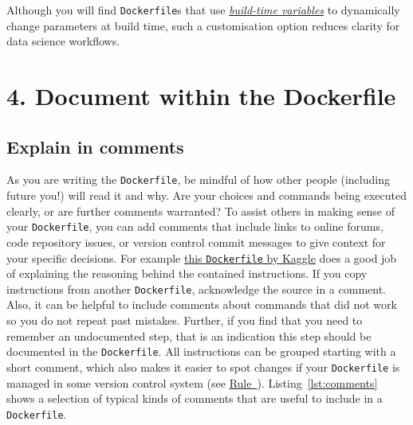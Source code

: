 \documentclass[10pt,letterpaper]{article}
\begin{document}
Although you will find \texttt{Dockerfile}s that use
\href{https://docs.docker.com/engine/reference/commandline/build/\#set-build-time-variables---build-arg}{\emph{build-time
variables}} to dynamically change parameters at build time, such a
customisation option reduces clarity for data science workflows.

\hypertarget{document-within-the-dockerfile}{%
\section{4. Document within the
Dockerfile}\label{document-within-the-dockerfile}}

  \label{rule:document} 

\hypertarget{explain-in-comments}{%
\subsection{Explain in comments}\label{explain-in-comments}}

As you are writing the \texttt{Dockerfile}, be mindful of how other
people (including future you!) will read it and why. Are your choices
and commands being executed clearly, or are further comments warranted?
To assist others in making sense of your \texttt{Dockerfile}, you can
add comments that include links to online forums, code repository
issues, or version control commit messages to give context for your
specific decisions. For example
\href{https://github.com/Kaggle/docker-rstats/blob/master/Dockerfile}{this
\texttt{Dockerfile} by Kaggle} does a good job of explaining the
reasoning behind the contained instructions. If you copy instructions
from another \texttt{Dockerfile}, acknowledge the source in a comment.
Also, it can be helpful to include comments about commands that did not
work so you do not repeat past mistakes. Further, if you find that you
need to remember an undocumented step, that is an indication this step
should be documented in the \texttt{Dockerfile}. All instructions can be
grouped starting with a short comment, which also makes it easier to
spot changes if your \texttt{Dockerfile} is managed in some version
control system (see
\hyperref[{rule:publish}]{Rule~}).
Listing~\ref{lst:comments} shows a selection of typical kinds of
comments that are useful to include in a \texttt{Dockerfile}.

\scriptsize
\end{document}
